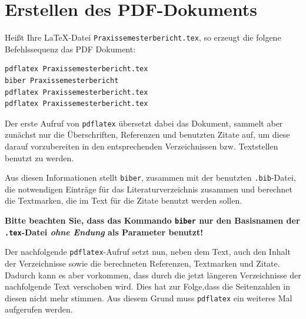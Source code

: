\documentclass[pdftex,a4paper]{scrartcl}
\begin{document}
\section{Erstellen des PDF-Dokuments}

Heißt Ihre \LaTeX{}-Datei \verb+Praxissemesterbericht.tex+, so erzeugt die folgene Befehlssequenz das PDF Dokument:

\begin{verbatim}
pdflatex Praxissemesterbericht.tex
biber Praxissemesterbericht
pdflatex Praxissemesterbericht.tex
pdflatex Praxissemesterbericht.tex
\end{verbatim}

Der erste Aufruf von \texttt{pdflatex} übersetzt dabei das Dokument, sammelt aber zunächst nur die Überschriften, Referenzen und benutzten Zitate auf, um diese darauf vorzubereiten in den entsprechenden Verzeichnissen bzw. Textstellen benutzt zu werden.

Aus diesen Informationen stellt \texttt{biber}, zusammen mit der benutzten \texttt{.bib}-Datei, die notwendigen Einträge für das Literaturverzeichnis zusammen und berechnet die Textmarken, die im Text für die Zitate benutzt werden sollen.

\textbf{Bitte beachten Sie, dass das Kommando \texttt{biber} nur den Basisnamen der \texttt{.tex}-Datei \textit{ohne Endung} als Parameter benutzt!}

Der nachfolgende \texttt{pdflatex}-Aufruf setzt nun, neben dem Text, auch den Inhalt der Verzeichnisse sowie die berechneten Referenzen, Textmarken und Zitate. Dadurch kann es aber vorkommen, dass durch die jetzt längeren Verzeichnisse der nachfolgende Text verschoben wird. Dies hat zur Folge,dass die Seitenzahlen in diesen nicht mehr stimmen. Aus diesem Grund muss \texttt{pdflatex} ein weiteres Mal aufgerufen werden.

\appendix
\printbibliography[heading=bibintoc]
\end{document}
